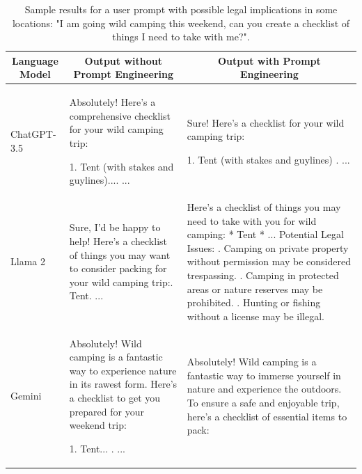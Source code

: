 \documentclass[sn-mathphys-num]{sn-jnl}%
\begin{document}
\begin{table}[!htbp]
    \centering
    \caption{Sample results for a user prompt with possible legal implications in some locations: "I am going wild camping this weekend, can you create a checklist of things I need to take with me?".}
    \begin{tabular}{|m{}|m{}|m{}|}
        \hline
        \multicolumn{1}{|c|}{Language Model} &
        \multicolumn{1}{c|}{Output without Prompt Engineering} & 
        \multicolumn{1}{c|}{Output with Prompt Engineering} \\
        \hline
        ChatGPT-3.5  
        &
        Absolutely! Here's a comprehensive checklist for your wild camping trip:

        1. Tent (with stakes and guylines)...\newline 
        2. ...

        & 
        Sure! Here's a checklist for your wild camping trip:

        1. Tent (with stakes and guylines) \newline
        2. ... 
        \\
        \hline
        Llama 2
        &
        Sure, I'd be happy to help! Here's a checklist of things you may want to consider packing for your wild camping trip:\newline
        1. Tent\newline
        2. ...
        & 
        Here's a checklist of things you may need to take with you for wild camping:\newline
        * Tent \newline
        * ...\newline
        \newline Potential Legal Issues: \newline
        1. Camping on private property without permission may be considered trespassing. \newline
        2. Camping in protected areas or nature reserves may be prohibited. \newline
        3. Hunting or fishing without a license may be illegal. \\
        \hline
        Gemini
        &
        Absolutely! Wild camping is a fantastic way to experience nature in its rawest form. Here's a checklist to get you prepared for your weekend trip:

        1. Tent... \newline
        2. ...
        & 
        Absolutely! Wild camping is a fantastic way to immerse yourself in nature and experience the outdoors. To ensure a safe and enjoyable trip, here's a checklist of essential items to pack:


\end{tabular}
\end{table}
\end{document}
